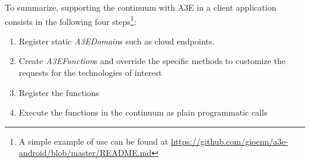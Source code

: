 To summarize, supporting the continuum with A3E in a client application consists in the following four steps\footnote{A simple example of use can be found at \url{https://github.com/gioenn/a3e-android/blob/master/README.md}}:

\begin{enumerate}
	\item Register static \textit{A3EDomain}s such as cloud endpoints.
	\item Create \textit{A3EFunction}s and override the specific methods to customize the requests for the technologies of interest
	\item Register the functions
	\item Execute the functions in the continuum as plain programmatic calls 
\end{enumerate}
